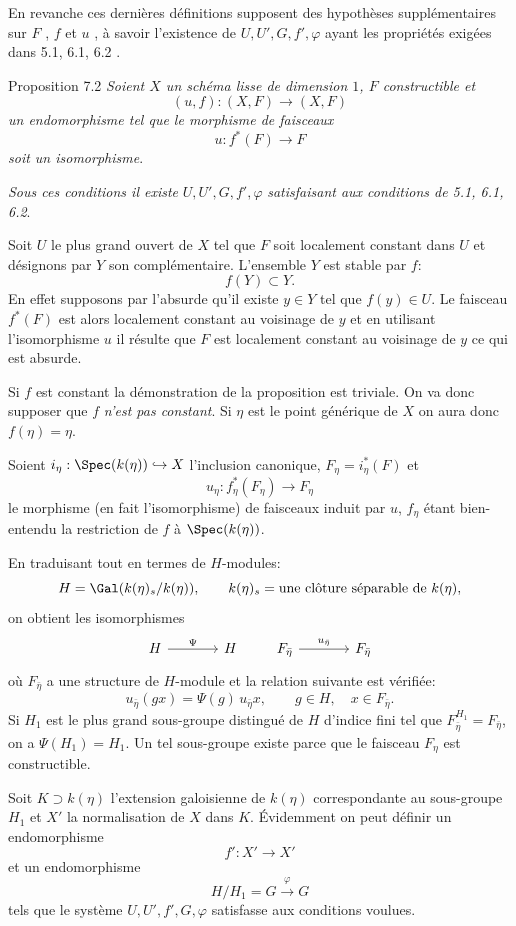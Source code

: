 En revanche ces dernières définitions supposent des hypothèses supplémentaires sur $F$ , $f$ et $u$ , à savoir l'existence de $U, U', G, f', \varphi$ ayant les propriétés exigées dans 5.1, 6.1, 6.2 .


\begin{statement}{Proposition 7.2}
\emph{Soient $X$ un schéma lisse de dimension $1$, $F$ constructible et}
\[
(u,f):(X,F)\longrightarrow (X,F)
\]
\emph{un endomorphisme tel que le morphisme de faisceaux}
\[
u:f^*(F)\longrightarrow F
\]
\emph{soit un isomorphisme}.

\emph{Sous ces conditions il existe} $U,U',G,f',\varphi$ \emph{satisfaisant aux conditions de 5.1, 6.1, 6.2}.
\end{statement}

\begin{prooftext}[Démonstration]
Soit $U$ le plus grand ouvert de $X$ tel que $F$ soit localement constant dans $U$ et désignons par $Y$ son complémentaire. L'ensemble $Y$ est stable par $f$:
\[
f(Y)\subset Y.
\]
En effet supposons par l'absurde qu'il existe $y\in Y$ tel que $f(y)\in U$. Le faisceau $f^*(F)$ est alors localement constant au voisinage de $y$ et en utilisant l'isomorphisme $u$ il résulte que $F$ est localement constant au voisinage de $y$ ce qui est absurde.

Si $f$ est constant la démonstration de la proposition est triviale. On va donc supposer que $f$ \emph{n'est pas constant}. Si $\eta$ est le point générique de $X$ on aura donc $f(\eta)=\eta$.

Soient $i_\eta:\Spec(k(\eta))\hookrightarrow X$ l'inclusion canonique, $F_\eta=i_\eta^*(F)$ et
\[
u_\eta:f_\eta^*(F_\eta)\longrightarrow F_\eta
\]
le morphisme (en fait l'isomorphisme) de faisceaux induit par $u$, $f_\eta$ étant bien-entendu la restriction de $f$ à $\Spec(k(\eta))$.

En traduisant tout en termes de $H$-modules:
\[
H=\Gal(k(\eta)_s/k(\eta)),\qquad k(\eta)_s=\text{une clôture séparable de }k(\eta),
\]
on obtient les isomorphismes
\[
\begin{tikzcd}[column sep=large]
H \arrow[r,"\Psi"] & H
\end{tikzcd}
\qquad
\begin{tikzcd}[column sep=large]
F_{\bar\eta} \arrow[r,"u_{\bar\eta}"] & F_{\bar\eta}
\end{tikzcd}
\]
où $F_{\bar\eta}$ a une structure de $H$-module et la relation suivante est vérifiée:
\[
u_{\bar\eta}(gx)=\Psi(g)\,u_{\bar\eta} x,
\qquad g\in H,
\quad x\in F_{\bar\eta}.
\]
Si $H_1$ est le plus grand sous-groupe distingué de $H$ d'indice fini tel que $F_{\bar\eta}^{H_1}=F_{\bar\eta}$, on a $\Psi(H_1)=H_1$. Un tel sous-groupe existe parce que le faisceau $F_\eta$ est constructible.

Soit $K\supset k(\eta)$ l'extension galoisienne de $k(\eta)$ correspondante au sous-groupe $H_1$ et $X'$ la normalisation de $X$ dans $K$. Évidemment on peut définir un endomorphisme
\[
f':X'\longrightarrow X'
\]
et un endomorphisme
\[
H/H_1=G\xrightarrow{\varphi}G
\]
tels que le système $U,U',f',G,\varphi$ satisfasse aux conditions voulues.
\end{prooftext}

